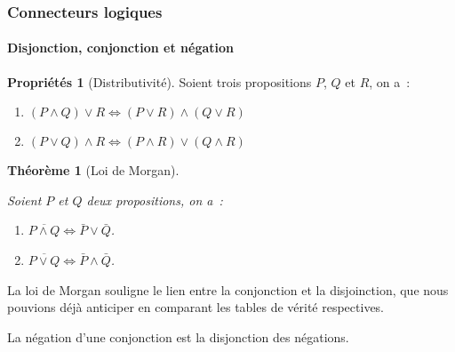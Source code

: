 \documentclass[10pt,notheorems]{beamer}
\theoremstyle{plain}
\newtheorem{theorem}{Théorème}
\theoremstyle{definition} %
\newtheorem{properties}{Propriétés}
\begin{document}
\begin{frame}
  \frametitle{Connecteurs logiques}
  \framesubtitle{Disjonction, conjonction et négation}
  \hypertarget{slide_disjonction_conjonction_et_negation}{}

  \begin{properties}[Distributivité]\label{properties:distributivite}
    Soient trois propositions $P$, $Q$ et $R$, on a~:
    \begin{enumerate}
    \item $(P\land Q)\lor R \Leftrightarrow (P\lor R) \land (Q\lor R)$
    \item $(P\lor Q)\land R \Leftrightarrow (P\land R) \lor (Q\land R)$
    \end{enumerate}
  \end{properties}

  \bigskip

  \begin{theorem}[Loi de Morgan]\label{theorem:morgan}

    Soient $P$ et $Q$ deux propositions, on a~:
    \begin{enumerate}
    \item $\overline{P \land Q} \Leftrightarrow \bar P \lor \bar Q$.
    \item $\overline{P \lor Q} \Leftrightarrow \bar P \land \bar Q$.
    \end{enumerate}
  \end{theorem}

  \bigskip

  La loi de Morgan souligne le lien entre la conjonction et la disjoinction, que nous pouvions déjà anticiper en comparant les tables de vérité respectives.\newline

  La négation d'une conjonction est la disjonction des négations.

\end{frame}
\end{document}
